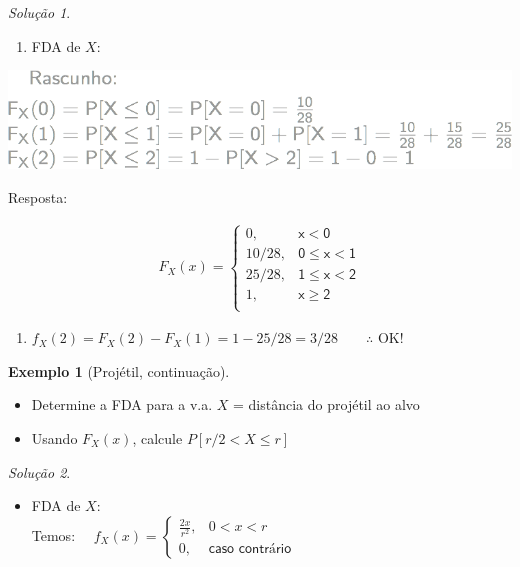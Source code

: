 \documentclass[
]{book}
\providecommand{\tightlist}{%
  \setlength{\itemsep}{0pt}\setlength{\parskip}{0pt}}
\theoremstyle{definition}
\theoremstyle{definition}
\newtheorem{example}{Exemplo}[chapter]
\theoremstyle{definition}
\theoremstyle{remark}
\newtheorem*{solution}{Solução}
\begin{document}
\begin{solution}
{}
\end{solution}

\begin{enumerate}
\def\labelenumi{\alph{enumi}.}
\tightlist
\item
  FDA de \(X\):
\end{enumerate}

\includegraphics[width=0.6\linewidth]{img/comp-fda}

Resposta:

\begin{align*}
  {F_X(x)} =
  \begin{cases}
    0,       & \mathsf{x < 0}\\
    10/28,   & \mathsf{0 \leq x < 1}\\
    25/28,   & \mathsf{1 \leq x < 2}\\
    1,       & \mathsf{x \geq 2}\\
  \end{cases}
\end{align*}

\begin{enumerate}
\def\labelenumi{\alph{enumi}.}
\setcounter{enumi}{1}
\tightlist
\item
  \({f_X(2) = F_X(2) - F_X(1) = 1 - 25/28 = 3/28 \qquad \therefore}\) OK!
\end{enumerate}

\begin{example}[Projétil, continuação]
\protect\hypertarget{exm:unnamed-chunk-13}{}{\label{exm:unnamed-chunk-13} {} }
\end{example}

\begin{itemize}
\item
  Determine a FDA para a v.a. \(X\) = distância do projétil ao alvo
\item
  Usando \({F_X(x)}\), calcule \({P[r/2 < X \leq r]}\)
\end{itemize}

\begin{solution}
{}
\end{solution}

\begin{itemize}
\tightlist
\item
  FDA de \(X\):\\
  Temos: \(\quad f_X(x) = \left\{ \begin{array}{ll} \frac{2x}{r^2}, & 0 < x < r\\ 0, & \textsf{caso contrário} \end{array} \right.\)
\end{itemize}
\end{document}
